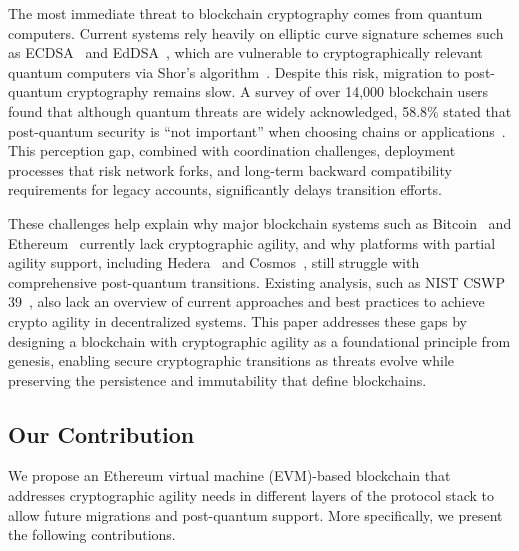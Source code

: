 The most immediate threat to blockchain cryptography comes from quantum computers. 
Current systems rely heavily on elliptic curve signature schemes such as ECDSA~\cite{NIST:FIPS1865} and EdDSA~\cite{JCEng:BDLSY12}, which are vulnerable to cryptographically relevant quantum computers via Shor's algorithm~\cite{FOCS:Shor94}. 
Despite this risk, migration to post-quantum cryptography remains slow. 
A survey of over 14,000 blockchain users found that although quantum threats are widely acknowledged, 58.8\% stated that post-quantum security is ``not important'' when choosing chains or applications~\cite{tectonic2025quantumdisconnect}. 
This perception gap, combined with coordination challenges, deployment processes that risk network forks, and long-term backward compatibility requirements for legacy accounts, significantly delays transition efforts.

These challenges help explain why major blockchain systems such as Bitcoin~\cite{BTC:NA08} and Ethereum~\cite{ETH:BU13} currently lack cryptographic agility, and why platforms with partial agility support, including Hedera~\cite{HEDERA:BHM20} and Cosmos~\cite{COSMOS:KB16}, still struggle with comprehensive post-quantum transitions. 
Existing analysis, such as NIST CSWP 39~\cite{NIST:BCC+25}, also lack an overview of current approaches and best practices to achieve crypto agility in decentralized systems. 
This paper addresses these gaps by designing a blockchain with cryptographic agility as a foundational principle from genesis, enabling secure cryptographic transitions as threats evolve while preserving the persistence and immutability that define blockchains.

\subsection{Our Contribution}\label{subsec:contribution}

We propose an Ethereum virtual machine (EVM)-based blockchain that addresses cryptographic agility needs in different layers of the protocol stack to allow future migrations and post-quantum support.
More specifically, we present the following contributions.

